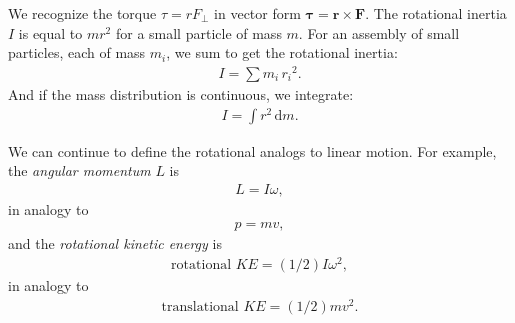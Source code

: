 We recognize the torque \(\tau = rF_{\perp}\) in vector form \(\boldsymbol{\tau} = \textbf{r}\times\textbf{F}\).  The rotational inertia \(I\) is equal to \(mr^2\) for a small particle of mass \(m\).  For an assembly of small particles, each of mass \(m_i\), we sum to get the rotational inertia:
\begin{align} I = \sum m_i\,{r_i}^2. \label{6Aexp7_eqn_2} \end{align}
And if the mass distribution is continuous, we integrate:
\begin{align} I = \int r^2\,\textrm{d}m. \end{align}

We can continue to define the rotational analogs to linear motion.  For example, the \textit{angular momentum} \(L\) is
\begin{align} L = I\omega, \label{6Aexp7_eqn_3} \end{align}
in analogy to
\begin{align} p = mv, \end{align}
and the \textit{rotational kinetic energy} is
\begin{align} \textrm{rotational } KE = (1/2)I\omega^2, \label{6Aexp7_eqn_4} \end{align}
in analogy to
\begin{align} \textrm{translational } KE = (1/2)mv^2. \end{align}

